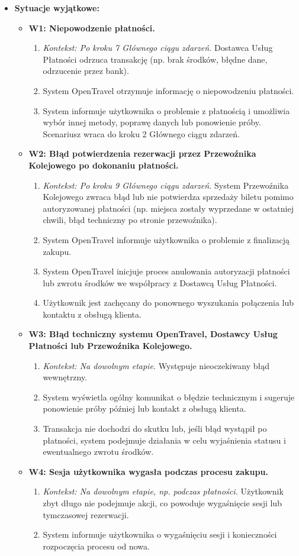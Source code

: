 \documentclass[a4paper,12pt]{article}
\begin{document}
\begin{itemize}
\item \textbf{Sytuacje wyjątkowe:}
\begin{itemize}
\item \textbf{W1: Niepowodzenie płatności.}
\begin{enumerate}
\item \textit{Kontekst: Po kroku 7 Głównego ciągu zdarzeń.} Dostawca Usług Płatności odrzuca transakcję (np. brak środków, błędne dane, odrzucenie przez bank).
\item System OpenTravel otrzymuje informację o niepowodzeniu płatności.
\item System informuje użytkownika o problemie z płatnością i umożliwia wybór innej metody, poprawę danych lub ponowienie próby. Scenariusz wraca do kroku 2 Głównego ciągu zdarzeń.
\end{enumerate}
\item \textbf{W2: Błąd potwierdzenia rezerwacji przez Przewoźnika Kolejowego po dokonaniu płatności.}
\begin{enumerate}
\item \textit{Kontekst: Po kroku 9 Głównego ciągu zdarzeń.} System Przewoźnika Kolejowego zwraca błąd lub nie potwierdza sprzedaży biletu pomimo autoryzowanej płatności (np. miejsca zostały wyprzedane w ostatniej chwili, błąd techniczny po stronie przewoźnika).
\item System OpenTravel informuje użytkownika o problemie z finalizacją zakupu.
\item System OpenTravel inicjuje proces anulowania autoryzacji płatności lub zwrotu środków we współpracy z Dostawcą Usług Płatności.
\item Użytkownik jest zachęcany do ponownego wyszukania połączenia lub kontaktu z obsługą klienta.
\end{enumerate}
\item \textbf{W3: Błąd techniczny systemu OpenTravel, Dostawcy Usług Płatności lub Przewoźnika Kolejowego.}
\begin{enumerate}
\item \textit{Kontekst: Na dowolnym etapie.} Występuje nieoczekiwany błąd wewnętrzny.
\item System wyświetla ogólny komunikat o błędzie technicznym i sugeruje ponowienie próby później lub kontakt z obsługą klienta.
\item Transakcja nie dochodzi do skutku lub, jeśli błąd wystąpił po płatności, system podejmuje działania w celu wyjaśnienia statusu i ewentualnego zwrotu środków.
\end{enumerate}
\item \textbf{W4: Sesja użytkownika wygasła podczas procesu zakupu.}
\begin{enumerate}
\item \textit{Kontekst: Na dowolnym etapie, np. podczas płatności.} Użytkownik zbyt długo nie podejmuje akcji, co powoduje wygaśnięcie sesji lub tymczasowej rezerwacji.
\item System informuje użytkownika o wygaśnięciu sesji i konieczności rozpoczęcia procesu od nowa.
\end{enumerate}
\end{itemize}
\end{itemize}
\end{document}
